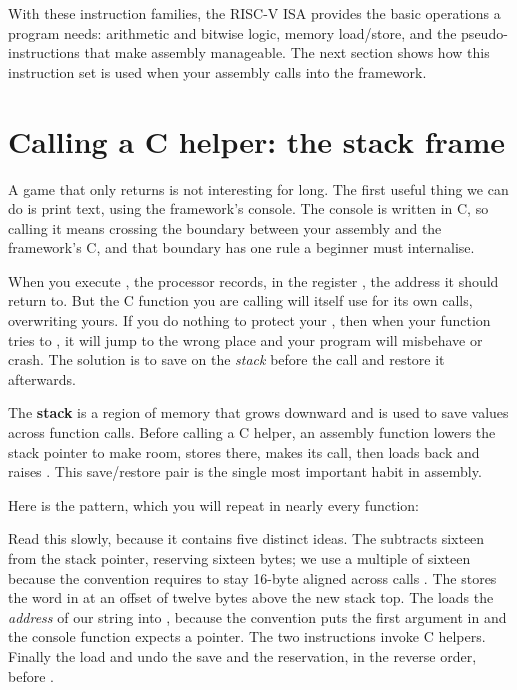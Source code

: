 With these instruction families, the RISC-V ISA provides the basic operations a
program needs: arithmetic and bitwise logic, memory load/store, and the
pseudo-instructions that make assembly manageable. The next section shows how
this instruction set is used when your assembly calls into the framework.

\section{Calling a C helper: the stack frame}
A game that only returns is not interesting for long. The first useful thing we
can do is print text, using the framework's console. The console is written in C,
so calling it means crossing the boundary between your assembly and the
framework's C, and that boundary has one rule a beginner must internalise.

When you execute , the processor records, in the register ,
the address it should return to. But the C function you are calling will itself
use  for its own calls, overwriting yours. If you do nothing to protect
your , then when your function tries to , it will jump to the
wrong place and your program will misbehave or crash. The solution is to save
 on the \emph{stack} before the call and restore it afterwards.

\begin{prgconcept}
The \textbf{stack} is a region of memory that grows downward and is used to save
values across function calls. Before calling a C helper, an assembly function
lowers the stack pointer  to make room, stores  there, makes its
call, then loads  back and raises . This save/restore pair is the
single most important habit in \riscv assembly.
\end{prgconcept}

Here is the pattern, which you will repeat in nearly every function:




Read this slowly, because it contains five distinct ideas. The  subtracts sixteen from the stack pointer, reserving sixteen bytes; we use a
multiple of sixteen because the convention requires  to stay 16-byte
aligned across calls \citep{prg32abi}. The  stores the word in
 at an offset of twelve bytes above the new stack top. The  loads the \emph{address} of our string into , because the
convention puts the first argument in  and the console function expects a
pointer. The two  instructions invoke C helpers. Finally the load and
 undo the save and the reservation, in the reverse order, before
.

